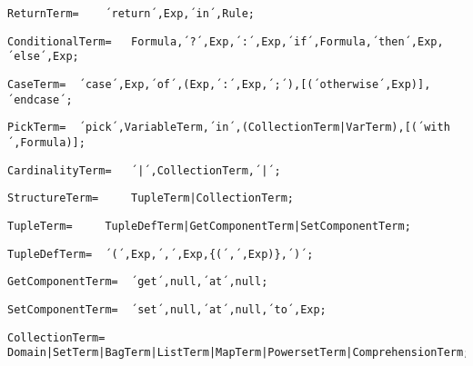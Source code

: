 \documentclass{article}
\begin{document}
    \begin{lstlisting}[mathescape=true]
     ReturnTerm= 	´return´,Exp,´in´,Rule;
    \end{lstlisting}
    
    \begin{lstlisting}[mathescape=true]
     ConditionalTerm= 	Formula,´?´,Exp,´:´,Exp,´if´,Formula,´then´,Exp,´else´,Exp;
    \end{lstlisting}
    
    \begin{lstlisting}[mathescape=true]
     CaseTerm= 	´case´,Exp,´of´,(Exp,´:´,Exp,´;´),[(´otherwise´,Exp)],´endcase´;
    \end{lstlisting}
    
    \begin{lstlisting}[mathescape=true]
     PickTerm= 	´pick´,VariableTerm,´in´,(CollectionTerm|VarTerm),[(´with´,Formula)];
    \end{lstlisting}
    
    \begin{lstlisting}[mathescape=true]
     CardinalityTerm= 	´|´,CollectionTerm,´|´;
    \end{lstlisting}
    
    \begin{lstlisting}[mathescape=true]
     StructureTerm= 	TupleTerm|CollectionTerm;
    \end{lstlisting}
    
    \begin{lstlisting}[mathescape=true]
     TupleTerm= 	TupleDefTerm|GetComponentTerm|SetComponentTerm;
    \end{lstlisting}
    
    \begin{lstlisting}[mathescape=true]
     TupleDefTerm= 	´(´,Exp,´,´,Exp,{(´,´,Exp)},´)´;
    \end{lstlisting}
    
    \begin{lstlisting}[mathescape=true]
     GetComponentTerm= 	´get´,null,´at´,null;
    \end{lstlisting}
    
    \begin{lstlisting}[mathescape=true]
     SetComponentTerm= 	´set´,null,´at´,null,´to´,Exp;
    \end{lstlisting}
    
    \begin{lstlisting}[mathescape=true]
     CollectionTerm= 	Domain|SetTerm|BagTerm|ListTerm|MapTerm|PowersetTerm|ComprehensionTerm;
    \end{lstlisting}
    
\end{document}
